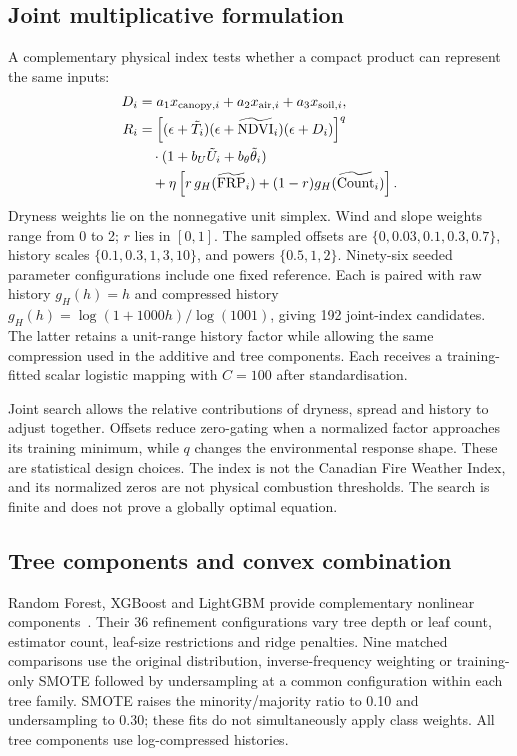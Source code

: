 \documentclass[conference]{IEEEtran}
\begin{document}
\subsection{Joint multiplicative formulation}
A complementary physical index tests whether a compact product can represent the same inputs:
\begin{align}
 D_i&=a_1x_{{\rm canopy},i}+a_2x_{{\rm air},i}+a_3x_{{\rm soil},i},\\
 R_i&=\left[(\epsilon+\tilde T_i)(\epsilon+\widetilde{\rm NDVI}_i)
 (\epsilon+D_i)\right]^q\notag\\
 &\quad\cdot(1+b_U\tilde U_i+b_\theta\tilde\theta_i)\notag\\
 &\quad+\eta\left[r\,g_H(\widetilde{\rm FRP}_i)+(1-r)g_H(\widetilde{\rm Count}_i)\right].
\end{align}
Dryness weights lie on the nonnegative unit simplex. Wind and slope weights range from 0 to 2; $r$ lies in $[0,1]$. The sampled offsets are $\{0,0.03,0.1,0.3,0.7\}$, history scales $\{0.1,0.3,1,3,10\}$, and powers $\{0.5,1,2\}$. Ninety-six seeded parameter configurations include one fixed reference. Each is paired with raw history $g_H(h)=h$ and compressed history $g_H(h)=\log(1+1000h)/\log(1001)$, giving 192 joint-index candidates. The latter retains a unit-range history factor while allowing the same compression used in the additive and tree components. Each receives a training-fitted scalar logistic mapping with $C=100$ after standardisation.

Joint search allows the relative contributions of dryness, spread and history to adjust together. Offsets reduce zero-gating when a normalized factor approaches its training minimum, while $q$ changes the environmental response shape. These are statistical design choices. The index is not the Canadian Fire Weather Index, and its normalized zeros are not physical combustion thresholds. The search is finite and does not prove a globally optimal equation.

\subsection{Tree components and convex combination}
Random Forest, XGBoost and LightGBM provide complementary nonlinear components~\cite{breiman,xgboost,lightgbm}. Their 36 refinement configurations vary tree depth or leaf count, estimator count, leaf-size restrictions and ridge penalties. Nine matched comparisons use the original distribution, inverse-frequency weighting or training-only SMOTE followed by undersampling at a common configuration within each tree family. SMOTE raises the minority/majority ratio to 0.10 and undersampling to 0.30; these fits do not simultaneously apply class weights. All tree components use log-compressed histories.
\end{document}
